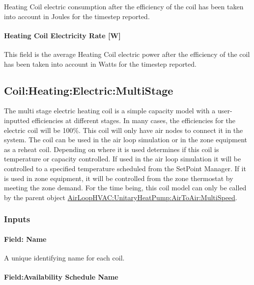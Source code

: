 Heating Coil electric consumption after the efficiency of the coil has been taken into account in Joules for the timestep reported.

\paragraph{Heating Coil Electricity Rate {[}W{]}}\label{heating-coil-electric-power-w}

This field is the average Heating Coil electric power after the efficiency of the coil has been taken into account in Watts for the timestep reported.

\subsection{Coil:Heating:Electric:MultiStage}\label{coilheatingelectricmultistage}

The multi stage electric heating coil is a simple capacity model with a user-inputted efficiencies at different stages. In many cases, the efficiencies for the electric coil will be 100\%. This coil will only have air nodes to connect it in the system. The coil can be used in the air loop simulation or in the zone equipment as a reheat coil. Depending on where it is used determines if this coil is temperature or capacity controlled. If used in the air loop simulation it will be controlled to a specified temperature scheduled from the SetPoint Manager. If it is used in zone equipment, it will be controlled from the zone thermostat by meeting the zone demand. For the time being, this coil model can only be called by the parent object \hyperref[airloophvacunitaryheatpumpairtoairmultispeed]{AirLoopHVAC:UnitaryHeatPump:AirToAir:MultiSpeed}.

\subsubsection{Inputs}\label{inputs-4-015}

\paragraph{Field: Name}\label{field-name-4-012}

A unique identifying name for each coil.

\paragraph{Field:Availability Schedule Name}\label{fieldavailability-schedule-name-4}

